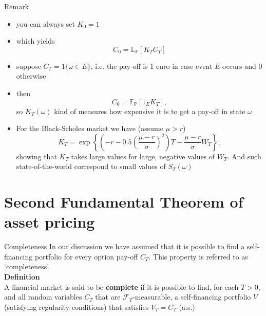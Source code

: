 \documentclass[pdf, handout]{beamer}
\begin{document}
\begin{frame}{Remark}
\begin{itemize}
\item you can always set $K_0=1$
\item which yields
\[
C_0 = \mathbb{E}_{\mathbb{P}}[ K_T C_T]
\]
\item
suppose $C_T = 1\{ \omega \in E\}$, i.e.
the pay-off is 1 euro in case event $E$ occurs
and 0 otherwise
\item
then
\[
C_0 = \mathbb{E}_{\mathbb{P}}[ 1_E K_T],
\]
so $K_T(\omega)$ kind of measures how
expensive it is to get a pay-off in state $\omega$
\item For the Black-Scholes market we have (assume
$\mu>r$)
\[
K_T=\exp\left\{
\left(-r-0.5\left(\frac{\mu-r}{\sigma}\right)^2 \right)T -\frac{\mu-r}{\sigma} W_T
\right\},
\]
showing that $K_T$ takes large values for large, negative values of $W_T$. And such state-of-the-world
correspond to small values of $S_T(\omega)$
\end{itemize}
\end{frame}



\section{Second Fundamental Theorem of
asset pricing}


\begin{frame}{Completeness}
In our discussion we have assumed that
it is possible to find a self-financing portfolio for every
option pay-off $C_T$. This property is referred to as `completeness'.
\\ 
\vspace{.5cm}
\textbf{Definition} \\
A financial market is said to be \textbf{complete} if it is possible
to find, for each $T>0$, and all random variables $C_T$ that are $\mathcal{F}_T$-measurable, a
self-financing portfolio $V$ (satisfying regularity conditions)
that satisfies $V_T=C_T$ (a.s.)
\end{frame}
\end{document}
